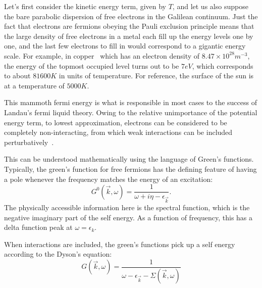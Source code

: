 \par
Let's first consider the kinetic energy term, given by $T$, and let us also suppose the bare parabolic dispersion of free electrons in the Galilean continuum.
Just the fact that electrons are fermions obeying the Pauli exclusion principle means that the large density of free electrons in a metal each fill up the energy levels one by one, and the last few electrons to fill in would correspond to a gigantic energy scale. For example, in copper~\cite{Ashcroft1976} which has an electron density of $8.47\times 10^{28} m^{-3}$, the energy of the topmost occupied level turns out to be $7 eV$, which corresponds to about $81600 K$ in units of temperature. For reference, the surface of the sun is at a temperature of $5000 K$. 
\par 
This mammoth fermi energy is what is responsible in most cases to the success of Landau's fermi liquid theory. Owing to the relative unimportance of the potential energy term, to lowest approximation, electrons can be considered to be completely non-interacting, from which weak interactions can be included perturbatively~\cite{luttinger1960ground,baym1961conservation,pines2018microscopic}. 
\par 
This can be understood mathematically using the language of Green's functions. Typically, the green's function for free fermions has the defining feature of having a pole whenever the frequency matches the energy of an excitation:
\begin{equation}
        G^0(\vec{k},\omega) = \frac{1}{\omega + i\eta - \epsilon_{\vec{k}}} .
\end{equation}
The physically accessible information here is the spectral function, which is the negative imaginary part of the self energy. As a function of frequency, this has a delta function peak at $\omega = \epsilon_k$. 
\par
When interactions are included, the green's functions pick up a self energy according to the Dyson's equation:
\begin{equation}
    G(\vec{k},\omega) = \frac{1}{\omega - \epsilon_{\vec{k}} - \Sigma(\vec{k},\omega)}
\end{equation}

